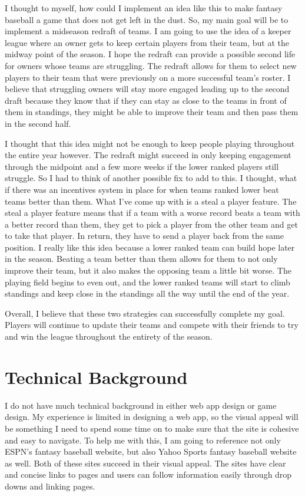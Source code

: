 \documentclass[10pt,twocolumn]{article}
\begin{document}
I thought to myself, how could I implement an idea like this to make fantasy baseball a game that does not get left in the dust. So, my main goal will be to implement a midseason redraft of teams. I am going to use the idea of a keeper league where an owner gets to keep certain players from their team, but at the midway point of the season. I hope the redraft can provide a possible second life for owners whose teams are struggling. The redraft allows for them to select new players to their team that were previously on a more successful team’s roster. I believe that struggling owners will stay more engaged leading up to the second draft because they know that if they can stay as close to the teams in front of them in standings, they might be able to improve their team and then pass them in the second half.

I thought that this idea might not be enough to keep people playing throughout the entire year however. The redraft might succeed in only keeping engagement through the midpoint and a few more weeks if the lower ranked players still struggle. So I had to think of another possible fix to add to this. I thought, what if there was an incentives system in place for when teams ranked lower beat teams better than them. What I’ve come up with is a steal a player feature. The steal a player feature means that if a team with a worse record beats a team with a better record than them, they get to pick a player from the other team and get to take that player. In return, they have to send a player back from the same position. I really like this idea because a lower ranked team can build hope later in the season. Beating a team better than them allows for them to not only improve their team, but it also makes the opposing team a little bit worse. The playing field begins to even out, and the lower ranked teams will start to climb standings and keep close in the standings all the way until the end of the year. 

Overall, I believe that these two strategies can successfully complete my goal. Players will continue to update their teams and compete with their friends to try and win the league throughout the entirety of the season. 

\section{Technical Background}

I do not have much technical background in either web app design or game design. My experience is limited in designing a web app, so the visual appeal will be something I need to spend some time on to make sure that the site is cohesive and easy to navigate. To help me with this, I am going to reference not only ESPN’s fantasy baseball website, but also Yahoo Sports fantasy baseball website as well. Both of these sites succeed in their visual appeal. The sites have clear and concise links to pages and users can follow information easily through drop downs and linking pages. 
\end{document}
